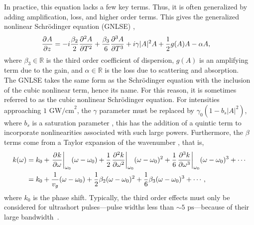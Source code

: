 In practice, this equation lacks a few key terms. Thus, it is often generalized by adding amplification, loss, and higher order terms. This gives the generalized nonlinear Schr\"odinger equation (GNLSE) \cite{agrawal2013, bohun, finot, peng, shtyrina, yarutkina},
\begin{align}
\label{eq:nlse}
\pdiff{A}{z} &= - i \frac{\beta_2}{2}\pdiff[2]{A}{T} + \frac{\beta_3}{6}\pdiff[3]{A}{T} + i \gamma |A|^2 A + \frac{1}{2}g(A) A - \alpha A,
\end{align}
where $\beta_3 \in \mathbb{R}$ is the third order coefficient of dispersion, $g(A)$ is an amplifying term due to the gain, and $\alpha \in \mathbb{R}$ is the loss due to scattering and absorption. \\

The GNLSE takes the same form as the Schr\"odinger equation with the inclusion of the cubic nonlinear term, hence its name. For this reason, it is sometimes referred to as the cubic nonlinear Schr\"odinger equation. For intensities approaching $1 \text{ GW/cm}^2$, the $\gamma$ parameter must be replaced by $\gamma_0 (1 - b_s |A|^2)$, where $b_s$ is a saturation parameter \cite{agrawal2013}, this has the addition of a quintic term to incorporate nonlinearities associated with such large powers. Furthermore, the $\beta$ terms come from a Taylor expansion of the wavenumber \cite{kartner}, that is,
\begin{align*}
k(\omega) &= k_0 + \left. \pdiff{k}{\omega}\right|_{\omega_0}(\omega - \omega_0) + \frac{1}{2} \left. \pdiff[2]{k}{\omega}\right|_{\omega_0}(\omega - \omega_0)^2 + \frac{1}{6} \left. \pdiff[3]{k}{\omega}\right|_{\omega_0}(\omega - \omega_0)^3 + \cdots \\
&= k_0 + \frac{1}{v_g}(\omega - \omega_0) + \frac{1}{2}\beta_2 (\omega - \omega_0)^2 + \frac{1}{6}\beta_3 (\omega - \omega_0)^3 + \cdots,
\end{align*}
where $k_0$ is the phase shift. Typically, the third order effects must only be considered for ultrashort pulses---pulse widths less than $\sim5 \text{ ps}$---because of their large bandwidth~\cite{agrawal2013}.

